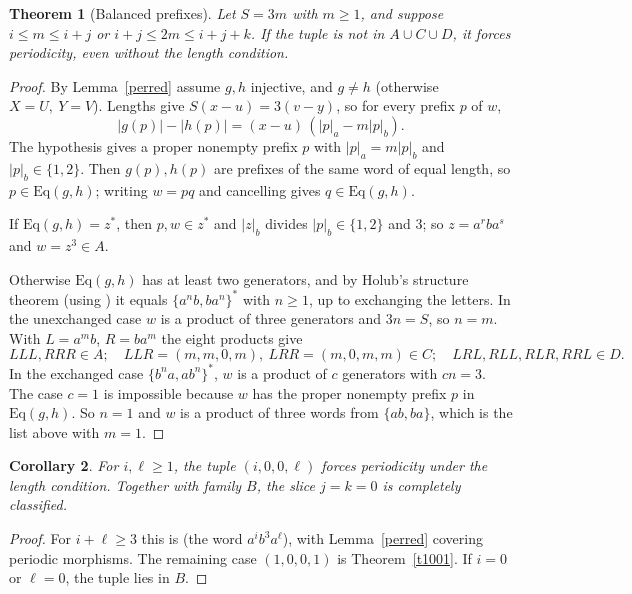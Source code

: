 \documentclass[11pt]{article}
\newtheorem{theorem}{Theorem}
\newtheorem{corollary}[theorem]{Corollary}
\theoremstyle{remark}\newtheorem*{remark}{Remark}
\begin{document}
\begin{theorem}[Balanced prefixes]\label{balanced}
Let \(S=3m\) with \(m\ge1\), and suppose \(i\le m\le i+j\) or \(i+j\le 2m\le i+j+k\). If the tuple is not in \(A\cup C\cup D\), it forces periodicity, even without the length condition.
\end{theorem}
\begin{proof}
By Lemma~\ref{perred} assume \(g,h\) injective, and \(g\ne h\) (otherwise \(X=U,\ Y=V\)). Lengths give \(S(x-u)=3(v-y)\), so for every prefix \(p\) of \(w\),
\[|g(p)|-|h(p)|=(x-u)\,(|p|_a-m|p|_b).\]
The hypothesis gives a proper nonempty prefix \(p\) with \(|p|_a=m|p|_b\) and \(|p|_b\in\{1,2\}\). Then \(g(p),h(p)\) are prefixes of the same word of equal length, so \(p\in\mathrm{Eq}(g,h)\); writing \(w=pq\) and cancelling gives \(q\in\mathrm{Eq}(g,h)\).

If \(\mathrm{Eq}(g,h)=z^*\), then \(p,w\in z^*\) and \(|z|_b\) divides \(|p|_b\in\{1,2\}\) and \(3\); so \(z=a^rba^s\) and \(w=z^3\in A\).

Otherwise \(\mathrm{Eq}(g,h)\) has at least two generators, and by Holub's structure theorem \cite{uniq} (using \cite{gen2}) it equals \(\{a^nb,ba^n\}^*\) with \(n\ge1\), up to exchanging the letters. In the unexchanged case \(w\) is a product of three generators and \(3n=S\), so \(n=m\). With \(L=a^mb\), \(R=ba^m\) the eight products give
\[
LLL,RRR\in A;\quad LLR=(m,m,0,m),\ LRR=(m,0,m,m)\in C;\quad LRL,RLL,RLR,RRL\in D .
\]
In the exchanged case \(\{b^na,ab^n\}^*\), \(w\) is a product of \(c\) generators with \(cn=3\). The case \(c=1\) is impossible because \(w\) has the proper nonempty prefix \(p\) in \(\mathrm{Eq}(g,h)\). So \(n=1\) and \(w\) is a product of three words from \(\{ab,ba\}\), which is the list above with \(m=1\).
\end{proof}

\begin{corollary}\label{outer}
For \(i,\ell\ge1\), the tuple \((i,0,0,\ell)\) forces periodicity under the length condition. Together with family \(B\), the slice \(j=k=0\) is completely classified.
\end{corollary}
\begin{proof}
For \(i+\ell\ge3\) this is \cite[Theorem 1]{hh} (the word \(a^ib^3a^\ell\)), with Lemma~\ref{perred} covering periodic morphisms. The remaining case \((1,0,0,1)\) is Theorem~\ref{t1001}. If \(i=0\) or \(\ell=0\), the tuple lies in \(B\).
\end{proof}
\end{document}
